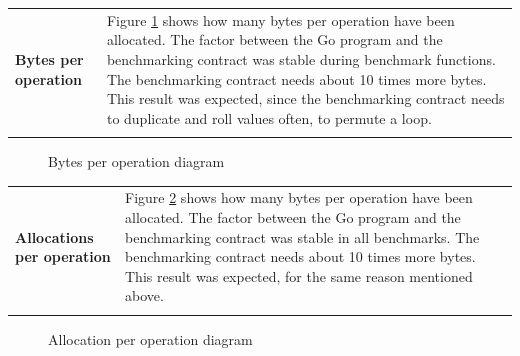 \begin{tabular}[t]{ p{3cm} p{12.5cm}}
\raggedright
\textbf{Bytes per operation} &
Figure \ref{bperop} shows how many bytes per operation have been allocated. The factor between the Go program and the benchmarking contract was stable during benchmark functions. The benchmarking contract needs about 10 times more bytes. This result was expected, since the benchmarking contract needs to duplicate and roll values often, to permute a loop. \\ \\
\end{tabular}

\begin{figure}[H]
	\begin{center}
	\caption{Bytes per operation diagram}
	\label{bperop}
	\end{center}
\end{figure}

\begin{tabular}[t]{ p{3cm} p{12.5cm}}
\raggedright
\textbf{Allocations per operation} &
Figure \ref{aperop} shows how many bytes per operation have been allocated. The factor between the Go program and the benchmarking contract was stable in all benchmarks. The benchmarking contract needs about 10 times more bytes. This result was expected, for the same reason mentioned above. \\ \\
\end{tabular}

\begin{figure}[H]
	\begin{center}
	\caption{Allocation per operation diagram}
	\label{aperop}
	\end{center}
\end{figure}



